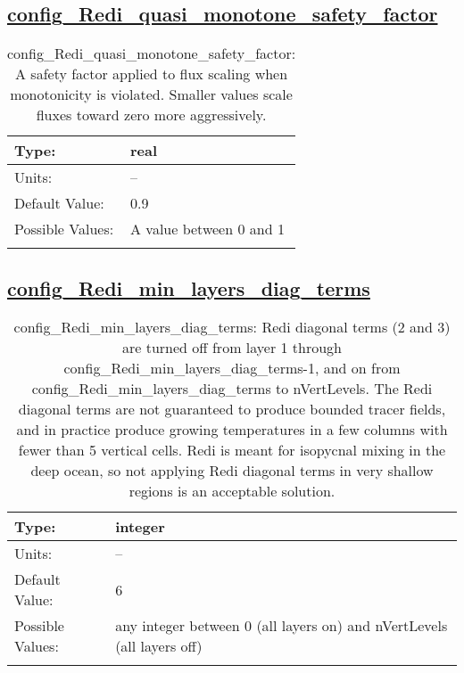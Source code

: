 \subsection[config\_Redi\_quasi\_monotone\_safety\_factor]{\hyperref[sec:nm_tab_Redi_isopycnal_mixing]{config\_Redi\_quasi\_monotone\_safety\_factor}}
\label{subsec:nm_sec_config_Redi_quasi_monotone_safety_factor}
\begin{center}
\begin{longtable}{| p{2.0in} || p{4.0in} |}
    \hline
    Type: & real \\
    \hline
    Units: & -- \\
    \hline
    Default Value: & 0.9 \\
    \hline
    Possible Values: & A value between 0 and 1 \\
    \hline
    \caption{config\_Redi\_quasi\_monotone\_safety\_factor: A safety factor applied to flux scaling when monotonicity is violated. Smaller values scale fluxes toward zero more aggressively.}
\end{longtable}
\end{center}
\subsection[config\_Redi\_min\_layers\_diag\_terms]{\hyperref[sec:nm_tab_Redi_isopycnal_mixing]{config\_Redi\_min\_layers\_diag\_terms}}
\label{subsec:nm_sec_config_Redi_min_layers_diag_terms}
\begin{center}
\begin{longtable}{| p{2.0in} || p{4.0in} |}
    \hline
    Type: & integer \\
    \hline
    Units: & -- \\
    \hline
    Default Value: & 6 \\
    \hline
    Possible Values: & any integer between 0 (all layers on) and nVertLevels (all layers off) \\
    \hline
    \caption{config\_Redi\_min\_layers\_diag\_terms: Redi diagonal terms (2 and 3) are turned off from layer 1 through config\_Redi\_min\_layers\_diag\_terms-1, and on from config\_Redi\_min\_layers\_diag\_terms to nVertLevels. The Redi diagonal terms are not guaranteed to produce bounded tracer fields, and in practice produce growing temperatures in a few columns with fewer than 5 vertical cells. Redi is meant for isopycnal mixing in the deep ocean, so not applying Redi diagonal terms in very shallow regions is an acceptable solution.}
\end{longtable}
\end{center}
